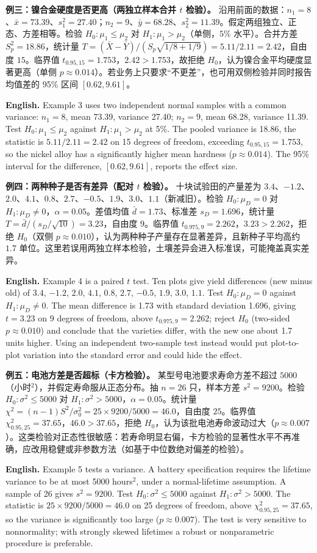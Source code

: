 \documentclass[UTF8,11pt,a4paper]{ctexart}
\newcommand{\EN}[1]{\par\noindent\textbf{English.} #1\par}
\begin{document}
\noindent\textbf{例三：镍合金硬度是否更高（两独立样本合并 $t$ 检验）。}
沿用前面的数据：$n_1=8$、$\bar x=73.39$、$s_1^2=27.40$；$n_2=9$、$\bar y=68.28$、$s_2^2=11.39$。假定两组独立、正态、方差相等。检验 $H_0:\mu_1\le\mu_2$ 对 $H_1:\mu_1>\mu_2$（单侧，$5\%$ 水平）。合并方差 $S_p^2=18.86$，统计量 $T=(\bar X-\bar Y)/(S_p\sqrt{1/8+1/9})=5.11/2.11=2.42$，自由度 $15$。临界值 $t_{0.95,15}=1.753$，$2.42>1.753$，故拒绝 $H_0$，认为镍合金平均硬度显著更高（单侧 $p\approx0.014$）。若业务上只要求“不更差”，也可用双侧检验并同时报告均值差的 95\% 区间 $[0.62,9.61]$。
\EN{Example 3 uses two independent normal samples with a common variance: $n_1=8$, mean 73.39, variance 27.40; $n_2=9$, mean 68.28, variance 11.39. Test $H_0:\mu_1\le\mu_2$ against $H_1:\mu_1>\mu_2$ at 5\%. The pooled variance is 18.86, the statistic is $5.11/2.11=2.42$ on 15 degrees of freedom, exceeding $t_{0.95,15}=1.753$, so the nickel alloy has a significantly higher mean hardness ($p\approx0.014$). The 95\% interval for the difference, $[0.62,9.61]$, reports the effect size.}

\noindent\textbf{例四：两种种子是否有差异（配对 $t$ 检验）。}
十块试验田的产量差为 $3.4$、$-1.2$、$2.0$、$4.1$、$0.8$、$2.7$、$-0.5$、$1.9$、$3.0$、$1.1$（新减旧）。检验 $H_0:\mu_D=0$ 对 $H_1:\mu_D\ne0$，$\alpha=0.05$。差值均值 $\bar d=1.73$、标准差 $s_D=1.696$，统计量 $T=\bar d/(s_D/\sqrt{10})=3.23$，自由度 $9$。临界值 $t_{0.975,9}=2.262$，$3.23>2.262$，拒绝 $H_0$（双侧 $p\approx0.010$），认为两种种子产量存在显著差异，且新种子平均高约 $1.7$ 单位。这里若误用两独立样本检验，土壤差异会进入标准误，可能掩盖真实差异。
\EN{Example 4 is a paired $t$ test. Ten plots give yield differences (new minus old) of $3.4$, $-1.2$, $2.0$, $4.1$, $0.8$, $2.7$, $-0.5$, $1.9$, $3.0$, $1.1$. Test $H_0:\mu_D=0$ against $H_1:\mu_D\ne0$. The mean difference is 1.73 with standard deviation 1.696, giving $t=3.23$ on 9 degrees of freedom, above $t_{0.975,9}=2.262$; reject $H_0$ (two-sided $p\approx0.010$) and conclude that the varieties differ, with the new one about 1.7 units higher. Using an independent two-sample test instead would put plot-to-plot variation into the standard error and could hide the effect.}

\noindent\textbf{例五：电池方差是否超标（卡方检验）。}
某型号电池要求寿命方差不超过 $5000$（小时$^2$），并假定寿命服从正态分布。抽 $n=26$ 只，样本方差 $s^2=9200$。检验 $H_0:\sigma^2\le5000$ 对 $H_1:\sigma^2>5000$，$\alpha=0.05$。统计量 $\chi^2=(n-1)S^2/\sigma_0^2=25\times9200/5000=46.0$，自由度 $25$。临界值 $\chi^2_{0.95,25}=37.65$，$46.0>37.65$，拒绝 $H_0$，认为该批电池寿命波动过大（$p\approx0.007$）。这类检验对正态性很敏感：若寿命明显右偏，卡方检验的显著性水平不再准确，应改用稳健或非参数方法（如基于中位数绝对偏差的检验）。
\EN{Example 5 tests a variance. A battery specification requires the lifetime variance to be at most 5000 hours$^2$, under a normal-lifetime assumption. A sample of 26 gives $s^2=9200$. Test $H_0:\sigma^2\le5000$ against $H_1:\sigma^2>5000$. The statistic is $25\times9200/5000=46.0$ on 25 degrees of freedom, above $\chi^2_{0.95,25}=37.65$, so the variance is significantly too large ($p\approx0.007$). The test is very sensitive to nonnormality; with strongly skewed lifetimes a robust or nonparametric procedure is preferable.}
\end{document}
